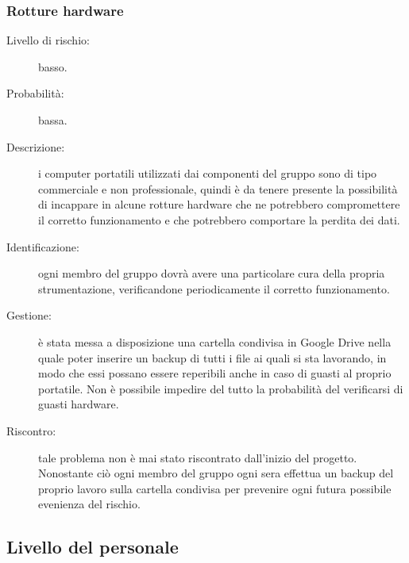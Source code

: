 \subsubsection{Rotture hardware}
\begin{description}
	\item[Livello di rischio:] basso.
	\item[Probabilità:] bassa.
	\item[Descrizione:] i computer portatili utilizzati dai componenti del gruppo sono di tipo commerciale e non professionale, quindi è da tenere presente la possibilità di incappare in alcune rotture hardware che ne potrebbero compromettere il corretto funzionamento e che potrebbero comportare la perdita dei dati.
	\item[Identificazione:] ogni membro del gruppo dovrà avere una particolare cura della propria strumentazione, verificandone periodicamente il corretto funzionamento.
	\item[Gestione:] è stata messa a disposizione una cartella condivisa in \gls{Google Drive} nella quale poter inserire un backup di tutti i file ai quali si sta lavorando, in modo che essi possano essere reperibili anche in caso di guasti al proprio portatile. Non è possibile impedire del tutto la probabilità del verificarsi di guasti hardware.
	\item[Riscontro:] tale problema non è mai stato riscontrato dall'inizio del progetto. Nonostante ciò ogni membro del gruppo ogni sera effettua un backup del proprio lavoro sulla cartella condivisa per prevenire ogni futura possibile evenienza del rischio.  
\end{description}

\subsection{Livello del personale}
